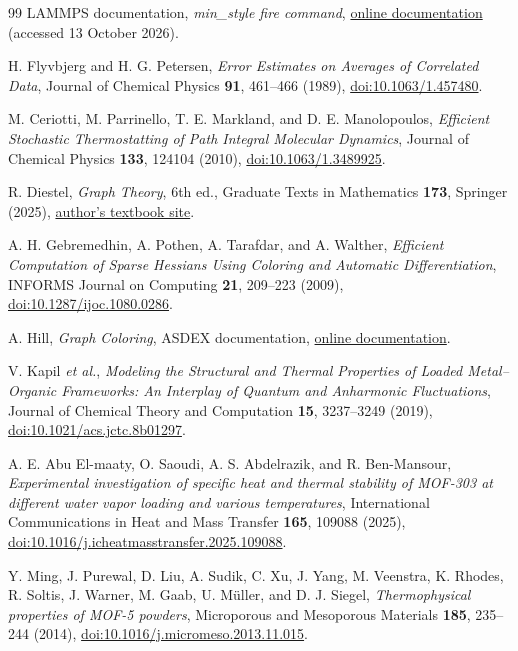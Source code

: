 \documentclass[12pt,a4paper]{article}
\numberwithin{equation}{section}
\begin{document}
\begin{thebibliography}{99}
LAMMPS documentation, \emph{min\_style fire command},
\href{https://docs.lammps.org/min_style.html}{online documentation}
(accessed 13 October 2026).

H. Flyvbjerg and H. G. Petersen,
\emph{Error Estimates on Averages of Correlated Data},
Journal of Chemical Physics \textbf{91}, 461--466 (1989),
\href{https://doi.org/10.1063/1.457480}{doi:10.1063/1.457480}.

M. Ceriotti, M. Parrinello, T. E. Markland, and D. E. Manolopoulos,
\emph{Efficient Stochastic Thermostatting of Path Integral Molecular Dynamics},
Journal of Chemical Physics \textbf{133}, 124104 (2010),
\href{https://doi.org/10.1063/1.3489925}{doi:10.1063/1.3489925}.

R. Diestel,
\emph{Graph Theory}, 6th ed.,
Graduate Texts in Mathematics \textbf{173}, Springer (2025),
\href{https://diestel-graph-theory.com/}{author's textbook site}.

A. H. Gebremedhin, A. Pothen, A. Tarafdar, and A. Walther,
\emph{Efficient Computation of Sparse Hessians Using Coloring and Automatic
Differentiation}, INFORMS Journal on Computing \textbf{21}, 209--223 (2009),
\href{https://doi.org/10.1287/ijoc.1080.0286}{doi:10.1287/ijoc.1080.0286}.

A. Hill, \emph{Graph Coloring}, ASDEX documentation,
\href{https://adrianhill.de/asdex/explanation/coloring/}{online documentation}.

V. Kapil \emph{et al.},
\emph{Modeling the Structural and Thermal Properties of Loaded
Metal--Organic Frameworks: An Interplay of Quantum and Anharmonic
Fluctuations}, Journal of Chemical Theory and Computation \textbf{15},
3237--3249 (2019),
\href{https://doi.org/10.1021/acs.jctc.8b01297}{doi:10.1021/acs.jctc.8b01297}.

A. E. Abu El-maaty, O. Saoudi, A. S. Abdelrazik, and R. Ben-Mansour,
\emph{Experimental investigation of specific heat and thermal stability of
MOF-303 at different water vapor loading and various temperatures},
International Communications in Heat and Mass Transfer \textbf{165},
109088 (2025),
\href{https://doi.org/10.1016/j.icheatmasstransfer.2025.109088}{doi:10.1016/j.icheatmasstransfer.2025.109088}.

Y. Ming, J. Purewal, D. Liu, A. Sudik, C. Xu, J. Yang, M. Veenstra,
K. Rhodes, R. Soltis, J. Warner, M. Gaab, U. M\"uller, and D. J. Siegel,
\emph{Thermophysical properties of MOF-5 powders},
Microporous and Mesoporous Materials \textbf{185}, 235--244 (2014),
\href{https://doi.org/10.1016/j.micromeso.2013.11.015}{doi:10.1016/j.micromeso.2013.11.015}.


\end{thebibliography}
\end{document}
